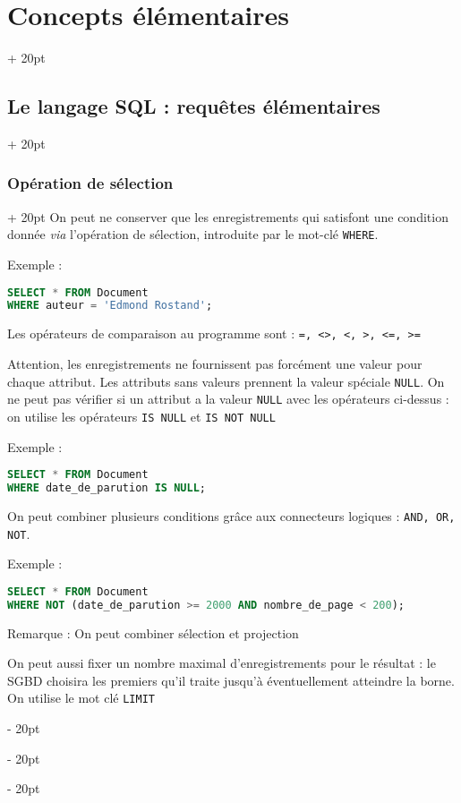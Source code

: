 \documentclass[a4paper, 12pt, twoside]{article}
\newcommand{\ind}[1][20pt]{\advance\leftskip + #1}
\newcommand{\deind}[1][20pt]{\advance\leftskip - #1}
\newenvironment{indt}[2][20pt]{#2 \par \ind[#1]}{\par \deind} %
\begin{document}
\begin{indt}{\section{Concepts élémentaires}}
\begin{indt}{\subsection{Le langage SQL : requêtes élémentaires}}
            \vspace{12pt}
            
            \begin{indt}{\subsubsection{Opération de sélection}}
                On peut ne conserver que les enregistrements qui satisfont une condition donnée \textit{via} l'opération de sélection, introduite par le mot-clé \texttt{WHERE}.

                Exemple :
                \begin{lstlisting}[language=SQL, xleftmargin=80pt]
SELECT * FROM Document
WHERE auteur = 'Edmond Rostand';\end{lstlisting}
                
                Les opérateurs de comparaison au programme sont : \texttt{=, <>, <, >, <=, >=}

                Attention, les enregistrements ne fournissent pas forcément une valeur pour chaque attribut. Les attributs sans valeurs prennent la valeur spéciale \texttt{NULL}. On ne peut pas vérifier si un attribut a la valeur \texttt{NULL} avec les opérateurs ci-dessus : on utilise les opérateurs \texttt{IS NULL} et \texttt{IS NOT NULL}

                Exemple :

                \begin{lstlisting}[language=SQL, xleftmargin=80pt]
SELECT * FROM Document
WHERE date_de_parution IS NULL;\end{lstlisting}

                On peut combiner plusieurs conditions grâce aux connecteurs logiques : \texttt{AND, OR, NOT}.

                Exemple :

                \begin{lstlisting}[language=SQL, xleftmargin=80pt]
SELECT * FROM Document
WHERE NOT (date_de_parution >= 2000 AND nombre_de_page < 200);\end{lstlisting}

                Remarque : On peut combiner sélection et projection

                On peut aussi fixer un nombre maximal d'enregistrements pour le résultat : le SGBD choisira les premiers qu'il traite jusqu'à éventuellement atteindre la borne. On utilise le mot clé \texttt{LIMIT}


\end{indt}
\end{indt}
\end{indt}
\end{document}
